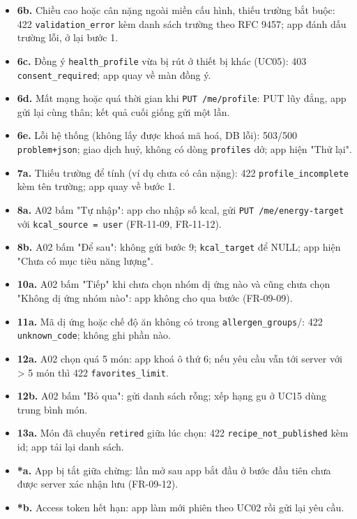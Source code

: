 \begin{itemize}
\item \textbf{6b.} Chiều cao hoặc cân nặng ngoài miền cấu hình, thiếu trường bắt buộc: 422 {\small\texttt{validation\_\allowbreak{}\allowbreak{}error}} kèm danh sách trường theo RFC 9457; app đánh dấu trường lỗi, ở lại bước 1.
\item \textbf{6c.} Đồng ý {\small\texttt{health\_\allowbreak{}\allowbreak{}profile}} vừa bị rút ở thiết bị khác (UC05): 403 {\small\texttt{consent\_\allowbreak{}\allowbreak{}required}}; app quay về màn đồng ý.
\item \textbf{6d.} Mất mạng hoặc quá thời gian khi {\small\texttt{PUT /\allowbreak{}\allowbreak{}me/\allowbreak{}\allowbreak{}profile}}: PUT lũy đẳng, app gửi lại cùng thân; kết quả cuối giống gửi một lần.
\item \textbf{6e.} Lỗi hệ thống (không lấy được khoá mã hoá, DB lỗi): 503/\allowbreak{}500 {\small\texttt{problem+json}}; giao dịch huỷ, không có dòng {\small\texttt{profiles}} dở; app hiện "Thử lại".
\item \textbf{7a.} Thiếu trường để tính (ví dụ chưa có cân nặng): 422 {\small\texttt{profile\_\allowbreak{}\allowbreak{}incomplete}} kèm tên trường; app quay về bước 1.
\item \textbf{8a.} A02 bấm "Tự nhập": app cho nhập số kcal, gửi {\small\texttt{PUT /\allowbreak{}\allowbreak{}me/\allowbreak{}\allowbreak{}energy-\allowbreak{}target}} với {\small\texttt{kcal\_\allowbreak{}\allowbreak{}source = user}} (FR-\allowbreak{}11-\allowbreak{}09, FR-\allowbreak{}11-\allowbreak{}12).
\item \textbf{8b.} A02 bấm "Để sau": không gửi bước 9; {\small\texttt{kcal\_\allowbreak{}\allowbreak{}target}} để NULL; app hiện "Chưa có mục tiêu năng lượng".
\item \textbf{10a.} A02 bấm "Tiếp" khi chưa chọn nhóm dị ứng nào và cũng chưa chọn "Không dị ứng nhóm nào": app không cho qua bước (FR-\allowbreak{}09-\allowbreak{}09).
\item \textbf{11a.} Mã dị ứng hoặc chế độ ăn không có trong {\small\texttt{allergen\_\allowbreak{}\allowbreak{}groups}}/: 422 {\small\texttt{unknown\_\allowbreak{}\allowbreak{}code}}; không ghi phần nào.
\item \textbf{12a.} A02 chọn quá 5 món: app khoá ô thứ 6; nếu yêu cầu vẫn tới server với > 5 món thì 422 {\small\texttt{favorites\_\allowbreak{}\allowbreak{}limit}}.
\item \textbf{12b.} A02 bấm "Bỏ qua": gửi danh sách rỗng; xếp hạng gu ở UC15 dùng trung bình món.
\item \textbf{13a.} Món đã chuyển {\small\texttt{retired}} giữa lúc chọn: 422 {\small\texttt{recipe\_\allowbreak{}\allowbreak{}not\_\allowbreak{}\allowbreak{}published}} kèm id; app tải lại danh sách.
\item \textbf{*a.} App bị tắt giữa chừng: lần mở sau app bắt đầu ở bước đầu tiên chưa được server xác nhận lưu (FR-\allowbreak{}09-\allowbreak{}12).
\item \textbf{*b.} Access token hết hạn: app làm mới phiên theo UC02 rồi gửi lại yêu cầu.
\end{itemize}
